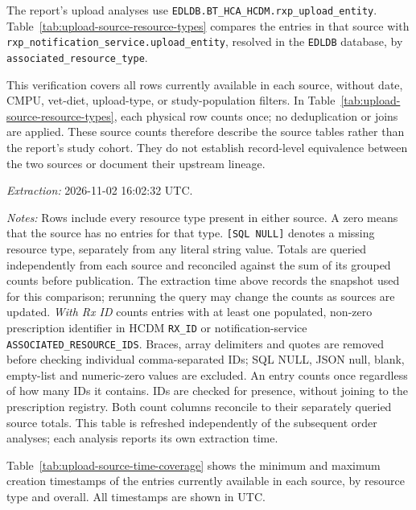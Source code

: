 \label{subsec:upload-data-sources}
The report's upload analyses use
\texttt{EDLDB.BT\_HCA\_HCDM.rxp\_upload\_entity}.
Table~\ref{tab:upload-source-resource-types} compares the entries in that
source with \texttt{rxp\_notification\_service.upload\_entity}, resolved in
the \texttt{EDLDB} database, by \texttt{associated\_resource\_type}.

This verification covers all rows currently available in each source,
without date, CMPU, vet-diet, upload-type, or study-population filters.
In Table~\ref{tab:upload-source-resource-types}, each physical row counts
once; no deduplication or joins are applied.
These source counts therefore describe the source tables rather than the report's
study cohort. They do not establish record-level equivalence between the
two sources or document their upstream lineage.


\noindent\textit{Extraction:} 2026-11-02 16:02:32 UTC.


\noindent\textit{Notes:} Rows include every resource type present in either
source. A zero means that the source has no entries for that type.
\texttt{[SQL NULL]} denotes a missing resource type, separately from any
literal string value. Totals are queried independently from each source
and reconciled against the sum of its grouped counts before publication.
The extraction time above records the snapshot used for this comparison;
rerunning the query may change the counts as sources are updated.
\textit{With Rx ID} counts entries with at least one populated, non-zero
prescription identifier in HCDM \texttt{RX\_ID} or notification-service
\texttt{ASSOCIATED\_RESOURCE\_IDS}. Braces, array delimiters and quotes are
removed before checking individual comma-separated IDs; SQL NULL, JSON null,
blank, empty-list and numeric-zero values are excluded. An entry counts once
regardless of how many IDs it contains. IDs are checked for presence, without
joining to the prescription registry. Both count columns reconcile to their
separately queried source totals.
This table is refreshed independently of the subsequent order analyses;
each analysis reports its own extraction time.


Table~\ref{tab:upload-source-time-coverage} shows the minimum and maximum creation timestamps of the entries currently available in each source, by resource type and overall. All timestamps are shown in UTC.

